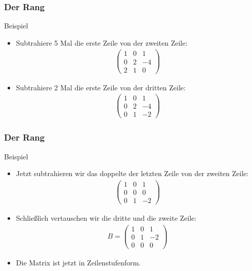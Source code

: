 \documentclass{beamer}
\newcommand{\mytitle}{Der Rang}
\begin{document}
\begin{frame}\frametitle{\mytitle}
	\begin{block}{Beispiel}
	\begin{itemize}
		\item Subtrahiere 5 Mal die erste Zeile von der zweiten Zeile:
			\begin{align*}
\begin{pmatrix} 1&0&1\\ 0&2&-4\\ 2&1&0 \end{pmatrix}
			\end{align*}
		\item Subtrahiere 2 Mal die erste Zeile von der dritten Zeile:
			\begin{align*}
\begin{pmatrix} 1&0&1\\ 0&2&-4\\ 0&1&-2 \end{pmatrix}
			\end{align*}
	\end{itemize}
	\end{block}
\end{frame}

\begin{frame}\frametitle{\mytitle}
	\begin{block}{Beispiel}
	\begin{itemize}
		\item Jetzt subtrahieren wir das doppelte der letzten Zeile von der zweiten Zeile:
			\begin{align*}
\begin{pmatrix} 1&0&1\\ 0&0&0\\ 0&1&-2 \end{pmatrix}
			\end{align*}
		\item Schlie\ss lich vertauschen wir die dritte und die zweite Zeile:
			\begin{align*}
B=\begin{pmatrix} 1&0&1\\  0&1&-2\\ 0&0&0\end{pmatrix}
			\end{align*}
		\item Die Matrix ist jetzt in Zeilenstufenform.
	\end{itemize}
	\end{block}
\end{frame}
\end{document}
